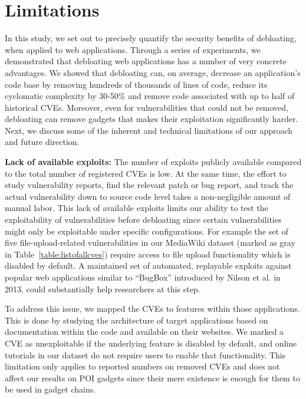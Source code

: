 \section{Limitations}
\label{sec:limitations}
In this study, we set out to precisely quantify the security benefits of
debloating, when applied to web applications. Through a series of experiments,
we demonstrated that debloating web applications has a number of very
concrete advantages. We showed that debloating can, on average, decrease an
application's code base by removing hundreds of thousands of lines of code,
reduce its cyclomatic complexity by 30-50\% and remove code associated with
up to half of historical CVEs. Moreover, even for vulnerabilities that could
not be removed, debloating can remove gadgets that makes their exploitation
significantly harder. Next, we discuss some of the inherent and technical limitations of our approach and future direction.

\vspace{1ex}

\noindent\textbf{Lack of available exploits:} The number of exploits publicly available compared to the total number of registered CVEs is low. At the same time, the effort to study vulnerability reports, find the relevant patch or bug report, and track the actual vulnerability down to source code level takes a non-negligible amount of manual labor.
This lack of available exploits limits our ability to test the exploitability of vulnerabilities before debloating since certain vulnerabilities might only be exploitable under specific configurations.
For example the set of five file-upload-related vulnerabilities in our MediaWiki dataset (marked as gray in Table~\ref{table:listofallcves}) require access to file upload functionality which is disabled by default. A maintained set of automated, replayable exploits against popular web applications similar to ``BugBox'' introduced by Nilson et al. in 2013, could substantially help researchers at this step\cite{bugbox}.

To address this issue, we mapped the CVEs to features within those applications. This is done by studying the architecture of
target applications based on documentation within the code and available on their websites. We marked a CVE as unexploitable if the underlying feature is disabled by default, and online tutorials in our dataset do not
require users to enable that functionality. This limitation only applies to reported numbers on removed CVEs and does not affect our results on POI gadgets since their mere existence is enough for them to be used in gadget chains.

